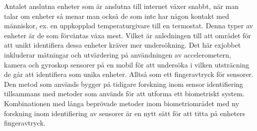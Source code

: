 Antalet anslutna enheter som är anslutna till internet växer snabbt, när man talar om enheter så menar man också de som inte har någon kontakt med människor, ex. en uppkopplad temperaturgivare till en termostat. Denna typer av enheter är de som förväntas växa mest. Vilket är anledningen till att området för att unikt identifiera dessa enheter kräver mer undersökning. Det här exjobbet inkluderar mätningar och utvärdering på användningen av accelerometern, kamera och gyroskop sensorer på en mobil för att undersöka i vilken utsträcning de går att identifiera som unika enheter. Alltså som ett fingeravtryck för sensorer. Den metod som används bygger på tidigare forskning inom sensor identifiering tillsammans med metoder som används för att utforma ett biometriskt system. Kombinationen med långa beprövade metoder inom biometriområdet med ny forskning inom identifiering av sensorer är en nytt sätt för att titta på enheters fingeravtryck.
